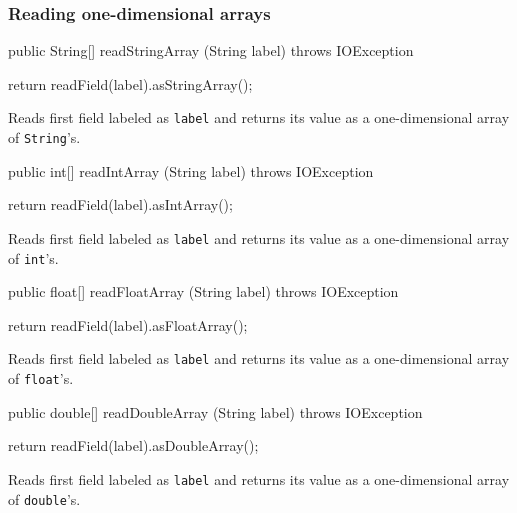 \subsubsection*{Reading one-dimensional arrays}
\begin{code}

   public String[] readStringArray (String label) throws IOException \begin{hide} {
      return readField(label).asStringArray();
   }
   \end{hide}
\end{code}
\begin{tabb}
Reads first field labeled as \texttt{label} and returns its value as a one-dimensional array of \texttt{String}'s.
\end{tabb}
\begin{code}

   public int[] readIntArray (String label) throws IOException \begin{hide} {
      return readField(label).asIntArray();
   }
   \end{hide}
\end{code}
\begin{tabb}
Reads first field labeled as \texttt{label} and returns its value as a one-dimensional array of \texttt{int}'s.
\end{tabb}
\begin{code}

   public float[] readFloatArray (String label) throws IOException \begin{hide} {
      return readField(label).asFloatArray();
   }
   \end{hide}
\end{code}
\begin{tabb}
Reads first field labeled as \texttt{label} and returns its value as a one-dimensional array of \texttt{float}'s.
\end{tabb}
\begin{code}

   public double[] readDoubleArray (String label) throws IOException \begin{hide} {
      return readField(label).asDoubleArray();
   }
   \end{hide}
\end{code}
\begin{tabb}
Reads first field labeled as \texttt{label} and returns its value as a one-dimensional array of \texttt{double}'s.
\end{tabb}

